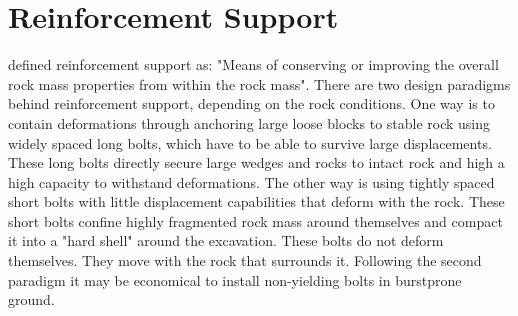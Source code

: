 \section{Reinforcement Support}

\Textcite[312]{Brady99} defined reinforcement support as: "Means of conserving or improving the overall rock mass properties from within the rock mass".
There are two design paradigms behind reinforcement support, depending on the rock conditions. One way is to contain deformations through anchoring large loose blocks to stable rock using widely spaced long bolts, which have to be able to survive large displacements. These long bolts directly secure large wedges and rocks to intact rock and high a high capacity to withstand deformations.
The other way is using tightly spaced short bolts with little displacement capabilities that deform with the rock. These short bolts confine highly fragmented rock mass around themselves and compact it into a "hard shell" around the excavation. \autocite[15]{guler01} These bolts do not deform themselves. They move with the rock that surrounds it.
Following the second paradigm it may be economical to install non-yielding bolts in burstprone ground. \autocite[6.23]{canada96}

